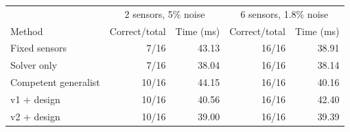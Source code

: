 \begin{tabular}{lrrrr}
\toprule & \multicolumn{2}{c}{2 sensors, 5\% noise} & \multicolumn{2}{c}{6 sensors, 1.8\% noise} \\
Method & Correct/total & Time (ms) & Correct/total & Time (ms) \\
\midrule
Fixed sensors & 7/16 & 43.13 & 16/16 & 38.91 \\
Solver only & 7/16 & 38.04 & 16/16 & 38.14 \\
Competent generalist & 10/16 & 44.15 & 16/16 & 40.16 \\
v1 + design & 10/16 & 40.56 & 16/16 & 42.40 \\
v2 + design & 10/16 & 39.00 & 16/16 & 39.39 \\
\bottomrule
\end{tabular}
